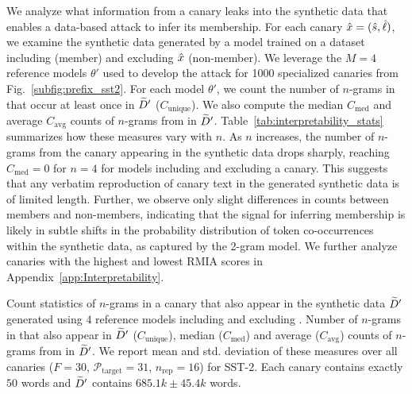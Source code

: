 We analyze what information from a canary leaks into the synthetic data that enables a data-based attack to infer its membership. For each canary ${\hat{x}} = ({\hat{s}}, {\hat{\ell}})$, we examine the synthetic data generated by a model trained on a dataset including (member) and excluding ${\hat{x}}$ (non-member). We leverage the $M=4$ reference models $\theta'$ used to develop the attack for \num{1000} specialized canaries from Fig.~\ref{subfig:prefix_sst2}.
%
For each model $\theta'$, we count the number of $n$-grams in  that occur at least once in ${\widetilde{D}}'$ ($C_\textrm{unique}$). We also compute the median $C_\textrm{med}$ and average $C_\textrm{avg}$ counts of $n$-grams from  in ${\widetilde{D}}'$. 
%
Table~\ref{tab:interpretability_stats} summarizes how these measures vary with $n$. As $n$ increases, the number of $n$-grams from the canary appearing in the synthetic data drops sharply, reaching $C_\textrm{med}=0$ for $n=4$ for models including and excluding a canary. This suggests that any verbatim reproduction of canary text in the generated synthetic data is of limited length. Further, we observe only slight differences in counts between members and non-members, indicating that the signal for inferring membership is likely in subtle shifts in the probability distribution of token co-occurrences within the synthetic data, as captured by the 2-gram model. We further analyze canaries with the highest and lowest RMIA scores in Appendix~\ref{app:Interpretability}. 

\begin{table*}[t!]
    \centering
    \footnotesize
    
    \caption{Count statistics of $n$-grams in a canary  that also appear in the synthetic data ${\widetilde{D}}'$ generated using $4$ reference models including and excluding . Number of $n$-grams in  that also appear in ${\widetilde{D}}'$ ($C_\textrm{unique}$), median ($C_\textrm{med}$) and average ($C_\textrm{avg}$) counts of $n$-grams from  in ${\widetilde{D}}'$. We report mean and std. deviation of these measures over all canaries ($F=30$, $\mathcal{P}_\textrm{target}=31$, $n_\textrm{rep}=16$) for SST-2. Each canary  contains exactly $50$ words and ${\widetilde{D}}'$ contains $685.1k\pm45.4k$ words.}
    \label{tab:interpretability_stats}
\end{table*}

